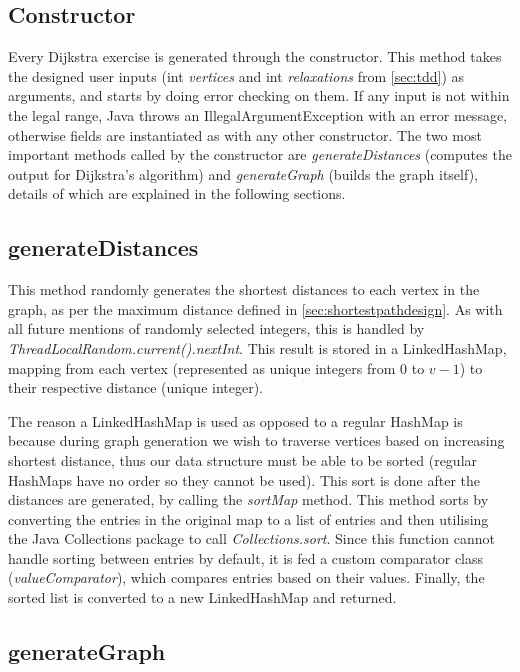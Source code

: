 \documentclass{l4proj}
\begin{document}
\subsection{Constructor}

Every Dijkstra exercise is generated through the constructor. This method takes the designed user inputs (int \emph{vertices} and int \emph{relaxations} from \autoref{sec:tdd}) as arguments, and  starts by doing error checking on them. If any input is not within the legal range, Java throws an IllegalArgumentException with an error message, otherwise fields are instantiated as with any other constructor. The two most important methods called by the constructor are \emph{generateDistances} (computes the output for Dijkstra's algorithm) and \emph{generateGraph} (builds the graph itself), details of which are explained in the following sections.

\subsection{generateDistances}

This method randomly generates the shortest distances to each vertex in the graph, as per the maximum distance defined in \autoref{sec:shortestpathdesign}. As with all future mentions of randomly selected integers, this is handled by \emph{ThreadLocalRandom.current().nextInt}. This result is stored in a LinkedHashMap, mapping from each vertex (represented as unique integers from $0$ to $v-1$) to their respective distance (unique integer). 

The reason a LinkedHashMap is used as opposed to a regular HashMap is because during graph generation we wish to traverse vertices based on increasing shortest distance, thus our data structure must be able to be sorted (regular HashMaps have no order so they cannot be used). This sort is done after the distances are generated, by calling the \emph{sortMap} method. This method sorts by converting the entries in the original map to a list of entries and then utilising the Java Collections package to call \emph{Collections.sort}. Since this function cannot handle sorting between entries by default, it is fed a custom comparator class (\emph{valueComparator}), which compares entries based on their values. Finally, the sorted list is converted to a new LinkedHashMap and returned.

\subsection{generateGraph}
\label{sec:generateGraph}
\end{document}
